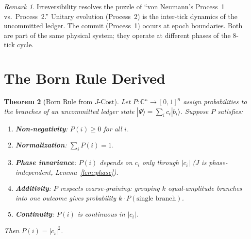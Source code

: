 \documentclass[12pt,a4paper]{article}
\newtheorem{theorem}{Theorem}[section]
\theoremstyle{definition}
\theoremstyle{remark}
\newtheorem{remark}[theorem]{Remark}
\begin{document}
\begin{remark}
Irreversibility resolves the puzzle of ``von Neumann's Process~1
vs.\ Process~2.''  Unitary evolution (Process~2) is the inter-tick
dynamics of the uncommitted ledger.  The commit (Process~1) occurs
at epoch boundaries.  Both are part of the same physical system;
they operate at different phases of the 8-tick cycle.
\end{remark}

\section{The Born Rule Derived}
\label{sec:born}

\begin{theorem}[Born Rule from $J$-Cost]
\label{thm:born}
Let $P: \mathbb{C}^n \to [0,1]^n$ assign probabilities to the
branches of an uncommitted ledger state
$|\Psi\rangle = \sum_i c_i |b_i\rangle$.  Suppose $P$ satisfies:
\begin{enumerate}[label=(\roman*),nosep]
  \item \textbf{Non-negativity}: $P(i) \geq 0$ for all $i$.
  \item \textbf{Normalization}: $\sum_i P(i) = 1$.
  \item \textbf{Phase invariance}: $P(i)$ depends on $c_i$
  only through $|c_i|$ ($J$ is phase-independent,
  Lemma~\ref{lem:phase}).
  \item \textbf{Additivity}: $P$ respects coarse-graining:
  grouping $k$ equal-amplitude branches into one outcome gives
  probability $k \cdot P(\text{single branch})$.
  \item \textbf{Continuity}: $P(i)$ is continuous in $|c_i|$.
\end{enumerate}
Then $P(i) = |c_i|^2$.
\end{theorem}
\end{document}
